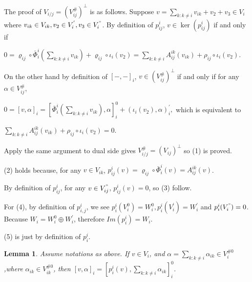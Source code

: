 \def\CTEXPreproc{Created by ctex v0.2.12, don't edit!}\documentclass[11pt]{article}
\newtheorem{lem}{Lemma}[section]
\begin{document}
\begin{pf}
 The proof of $V_{i/j} = ( V^{\#}_{ij}  )^{\perp}  $ is as follows. Suppose $v= \sum_{k: k\neq i} v_{ik} +v_2 +v_3 \in V_i$ where $v_{ik} \in V_{ik}, v_2 \in V^{'}_i , v_3 \in V^{"}_i  $. By definition of $ p^i _{ij} $, $v\in \ker(p^i _{ij})$ if and only if

$0= \varrho_{ij}\circ \bar{\Phi}^i _i (\sum_{k:k\neq i} v_{ik}   ) + \varrho_{ij}\circ \iota_i (v_2)
 = \sum_{k:k\neq i} A^{ik}_{ij} (v_{ik}) + \rho_{ij} \circ \iota_i (v_2 ) .$

On the other hand by definition of $[-,-]_i$, $v\in ( V^{\#}_{ij}  )^{\perp} $ if and only if for any $\alpha \in V^{\#} _{ij} $,

 $ 0=[v,\alpha  ]_i =  [\bar{\Phi}^i _i ( \sum_{k:k\neq i} v_{ik}  ),\alpha   ]^0 _i + (\iota_i (v_2 ), \alpha  )^{'}_i ,$
 which is equivalent to

 $\sum_{k:k\neq i} A^{ik}_{ij} (v_{ik}) + \rho_{ij} \circ \iota_i (v_2 )=0$.

 Apply the same argument to dual side gives $ V^{\#} _{i/j} = ( V_{ij}  )^{\perp}   $ so (1) is proved.

 (2) holds because, for any $v\in V_{ik}$, $p^i _{ij} (v) = \varrho_{ij} \circ \bar{\Phi}^i _i (v) = A^{ik}_{ij}(v)$.

 By definition of $p^i _{ij}$, for any $v\in V^{"}_{ij}$, $p^i _{ij} (v)=0$, so (3) follow.

 For (4), by definition of $p^i _{i,j}$, we see $p^i _i ( V^0 _i )= W^0 _i , p^i _i (V^{'}_i )=W^{'}_i  $ and $p^i _i (V^{"}_i )=0 $.
 Because $W_i = W^0 _i \oplus W^{'}_i$, therefore  $Im(p^i _i ) = W_i $.

  (5) is just by definition of $p^i _i$.\\
\end{pf}

\begin{lem} Assume notations as above. If $v \in V _i $, and
$\alpha =\sum_{k:k\neq i} \alpha_{ik}   \in V^{\# 0}_i$,where $\alpha_{ik}\in V^{\# 0}_{ik}$,
 then $[ v, \alpha  ]_i = [ p^i _i (v) , \sum_{k:k\neq i} \alpha_{ik}    ]^0 _i  $.
\end{lem}
\end{document}
